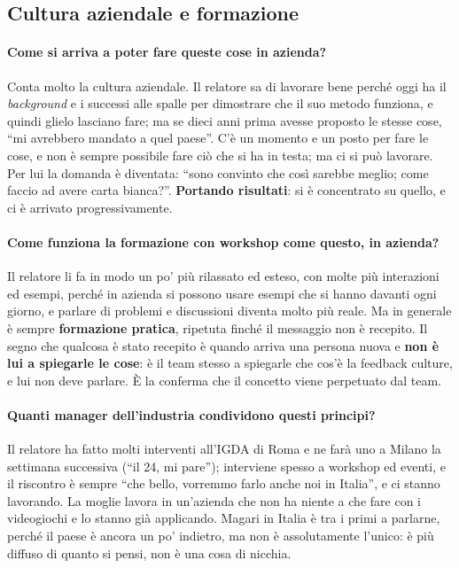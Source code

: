 \subsection{Cultura aziendale e formazione}

\paragraph{Come si arriva a poter fare queste cose in azienda?} Conta molto la cultura aziendale. Il
relatore sa di lavorare bene perché oggi ha il \emph{background} e i successi alle spalle per dimostrare
che il suo metodo funziona, e quindi glielo lasciano fare; ma se dieci anni prima avesse proposto le
stesse cose, ``mi avrebbero mandato a quel paese''. C'è un momento e un posto per fare le cose, e non è
sempre possibile fare ciò che si ha in testa; ma ci si può lavorare. Per lui la domanda è diventata:
``sono convinto che così sarebbe meglio; come faccio ad avere carta bianca?''. \textbf{Portando
risultati}: si è concentrato su quello, e ci è arrivato progressivamente.

\paragraph{Come funziona la formazione con workshop come questo, in azienda?} Il relatore li fa in modo
un po' più rilassato ed esteso, con molte più interazioni ed esempi, perché in azienda si possono usare
esempi che si hanno davanti ogni giorno, e parlare di problemi e discussioni diventa molto più reale. Ma
in generale è sempre \textbf{formazione pratica}, ripetuta finché il messaggio non è recepito. Il segno
che qualcosa è stato recepito è quando arriva una persona nuova e \textbf{non è lui a spiegarle le cose}:
è il team stesso a spiegarle che cos'è la feedback culture, e lui non deve parlare. È la conferma che il
concetto viene perpetuato dal team.

\paragraph{Quanti manager dell'industria condividono questi principi?} Il relatore ha fatto molti
interventi all'IGDA di Roma e ne farà uno a Milano la settimana successiva (``il 24, mi pare''); interviene
spesso a workshop ed eventi, e il riscontro è sempre ``che bello, vorremmo farlo anche noi in Italia'', e ci
stanno lavorando. La moglie lavora in un'azienda che non ha niente a che fare con i videogiochi e lo stanno
già applicando. Magari in Italia è tra i primi a parlarne, perché il paese è ancora un po' indietro, ma non è
assolutamente l'unico: è più diffuso di quanto si pensi, non è una cosa di nicchia.

